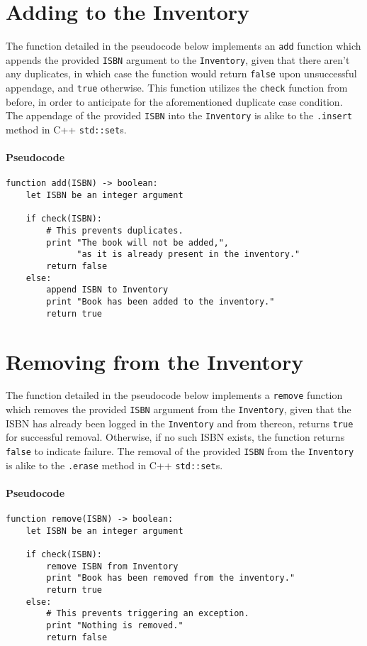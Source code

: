 \documentclass[12pt]{article}
\begin{document}
\pagebreak
\section{Adding to the Inventory}

The function detailed in the pseudocode below implements an \texttt{add} function which appends the provided \texttt{ISBN} argument to the \texttt{Inventory}, given that there aren't any duplicates, in which case the function would return \texttt{false} upon unsuccessful appendage, and \texttt{true} otherwise. This function utilizes the \texttt{check} function from before, in order to anticipate for the aforementioned duplicate case condition. The appendage of the provided \texttt{ISBN} into the \texttt{Inventory} is alike to the \texttt{.insert} method in C++ \texttt{std::set}s.

\paragraph{Pseudocode}
\begin{verbatim}
function add(ISBN) -> boolean:
    let ISBN be an integer argument

    if check(ISBN):
        # This prevents duplicates.
        print "The book will not be added,",
              "as it is already present in the inventory."
        return false
    else:
        append ISBN to Inventory
        print "Book has been added to the inventory."
        return true
\end{verbatim}

\pagebreak
\section{Removing from the Inventory}

The function detailed in the pseudocode below implements a \texttt{remove} function which removes the provided \texttt{ISBN} argument from the \texttt{Inventory}, given that the ISBN has already been logged in the \texttt{Inventory} and from thereon, returns \texttt{true} for successful removal. Otherwise, if no such ISBN exists, the function returns \texttt{false} to indicate failure. The removal of the provided \texttt{ISBN} from the \texttt{Inventory} is alike to the \texttt{.erase} method in C++ \texttt{std::set}s.

\paragraph{Pseudocode}
\begin{verbatim}
function remove(ISBN) -> boolean:
    let ISBN be an integer argument

    if check(ISBN):
        remove ISBN from Inventory
        print "Book has been removed from the inventory."
        return true
    else:
        # This prevents triggering an exception.
        print "Nothing is removed."
        return false
\end{verbatim}
\end{document}
